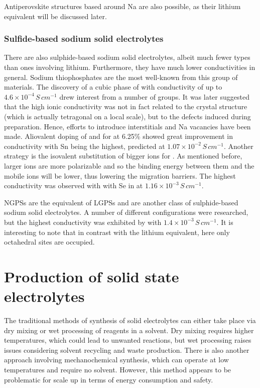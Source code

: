 \documentclass[10pt,a4paper, titlepage]{article}
\begin{document}
Antiperovskite structures based around Na are also possible, as their lithium equivalent will be discussed later.

\subsubsection{Sulfide-based sodium solid electrolytes}

There are also sulphide-based sodium solid electrolytes, albeit much fewer types than ones involving lithium.
Furthermore, they have much lower conductivities in general. 
Sodium thiophosphates are the most well-known from this group of materials. 
The discovery of a cubic phase of  with conductivity of up to $4.6 \times 10^{-4} \, S \, cm^{-1}$ \cite{RN35} drew interest from a number of groups. 
It was later suggested that the high ionic conductivity was not in fact related to the crystal structure (which is actually tetragonal on a local scale), but to the defects induced during preparation. \cite{RN36}
Hence, efforts to introduce  interstitials and Na vacancies have been made. 
Aliovalent doping of   and  for  at 6.25\% showed great improvement in conductivity with Sn being the highest, predicted at $1.07 \times 10^{-2} \, S \, cm^{-1}$. \cite{RN37}
Another strategy is the isovalent substitution of bigger ions for . 
As mentioned before, larger ions are more polarizable and so the binding energy between them and the mobile ions will be lower, thus lowering the migration barriers. 
The highest conductivity was observed with with Se in  at $1.16 \times 10^{-3} \, S \, cm^{-1}$. \cite{RN38} 

NGPSs are the equivalent of LGPSs and are another class of sulphide-based sodium solid electrolytes. 
A number of different configurations were researched, but the highest conductivity was exhibited by  with $1.4 \times 10^{-3} \, S \, cm^{-1}$. \cite{RN39}
It is interesting to note that in contrast with the lithium equivalent, here only octahedral sites are occupied. 

\section{Production of solid state electrolytes}

The traditional methods of synthesis of solid electrolytes can either take place via dry mixing or wet processing of reagents in a solvent.
Dry mixing requires higher temperatures, which could lead to unwanted reactions, but wet processing raises issues considering solvent recycling and waste production. 
There is also another approach involving mechanochemical synthesis, which can operate at low temperatures and require no solvent. 
However, this method appears to be problematic for scale up in terms of energy consumption and safety. 
\end{document}

